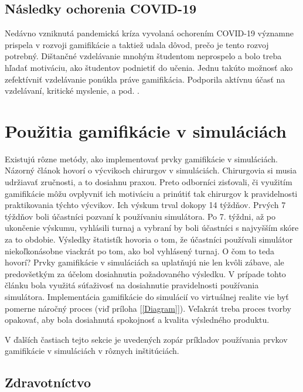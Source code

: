 \documentclass[10pt,slovak,a4paper]{article}
\begin{document}
\subsection{Následky ochorenia COVID-19} \label{COVID-19}

Nedávno vzniknutá pandemická kríza vyvolaná ochorením COVID-19 významne prispela v rozvoji gamifikácie a taktiež udala dôvod, prečo je tento rozvoj potrebný. Dištančné vzdelávanie mnohým študentom neprospelo a bolo treba hľadať motiváciu, ako študentov podnietiť do učenia. Jednu takúto možnosť ako zefektívniť vzdelávanie ponúkla práve gamifikácia. Podporila aktívnu účasť na vzdelávaní, kritické myslenie, a pod. \cite{DennikN}.


\section{Použitia gamifikácie v simuláciách} \label{Pouzitie.gamifikacie}

Existujú rôzne metódy, ako implementovať prvky gamifikácie v simuláciách. Názorný článok \cite{Kerfoot2014} hovorí o výcvikoch chirurgov v simuláciách. Chirurgovia si musia udržiavať zručnosti, a to dosiahnu praxou. Preto odborníci zisťovali, či využitím gamifikácie môžu ovplyvniť ich motiváciu a prinútiť tak chirurgov k pravidelnosti praktikovania týchto výcvikov. Ich výskum trval  dokopy 14 týždňov. Prvých 7 týždňov boli účastníci pozvaní k používaniu simulátora. Po 7. týždni, až po ukončenie výskumu, vyhlásili turnaj a vybraní by boli účastníci s najvyšším skóre za to obdobie. Výsledky štatistík hovoria o tom, že účastníci používali simulátor niekoľkonásobne viackrát po tom, ako bol vyhlásený turnaj. O čom to teda hovorí? Prvky gamifikácie v simuláciách sa uplatňujú nie len kvôli zábave, ale predovšetkým za účelom dosiahnutia požadovaného výsledku. V prípade tohto článku bola využitá súťaživosť na dosiahnutie pravidelnosti používania simulátora. Implementácia gamifikácie do simulácií vo virtuálnej realite vie byť pomerne náročný proces (viď príloha [\ref{Diagram}]). Veľakrát treba proces tvorby opakovať, aby bola dosiahnutá spokojnosť a kvalita výsledného produktu. 

V ďalších častiach tejto sekcie je uvedených zopár príkladov používania prvkov gamifikácie v simuláciách v rôznych inštitúciách.

\clearpage

\subsection{Zdravotníctvo} \label{Zdravotnictvo}
\end{document}
